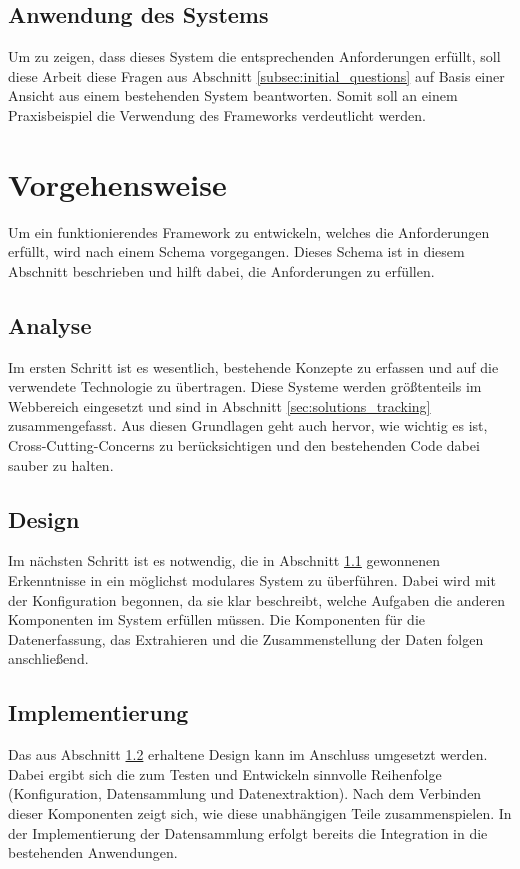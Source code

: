 \subsection{Anwendung des Systems}
Um zu zeigen, dass dieses System die entsprechenden Anforderungen erfüllt, soll diese Arbeit diese Fragen aus Abschnitt \ref{subsec:initial_questions} auf Basis einer Ansicht aus einem bestehenden System beantworten. Somit soll an einem Praxisbeispiel die Verwendung des Frameworks verdeutlicht werden.

\section{Vorgehensweise}
Um ein funktionierendes Framework zu entwickeln, welches die Anforderungen erfüllt, wird nach einem Schema vorgegangen. Dieses Schema ist in diesem Abschnitt beschrieben und hilft dabei, die Anforderungen zu erfüllen.

\subsection{Analyse}
\label{subsec:research}
Im ersten Schritt ist es wesentlich, bestehende Konzepte zu erfassen und auf die verwendete Technologie zu übertragen. Diese Systeme werden größtenteils im Webbereich eingesetzt und sind in Abschnitt \ref{sec:solutions_tracking} zusammengefasst. Aus diesen Grundlagen geht auch hervor, wie wichtig es ist, Cross-Cutting-Concerns \cite{crosscutting} zu berücksichtigen und den bestehenden Code dabei sauber zu halten.

\subsection{Design}
\label{subsec:design_info}
Im nächsten Schritt ist es notwendig, die in Abschnitt \ref{subsec:research} gewonnenen Erkenntnisse in ein möglichst modulares System zu überführen. Dabei wird mit der Konfiguration begonnen, da sie klar beschreibt, welche Aufgaben die anderen Komponenten im System erfüllen müssen. Die Komponenten für die Datenerfassung, das Extrahieren und die Zusammenstellung der Daten folgen anschließend.

\subsection{Implementierung}
Das aus Abschnitt \ref{subsec:design_info} erhaltene Design kann im Anschluss umgesetzt werden. Dabei ergibt sich die zum Testen und Entwickeln sinnvolle Reihenfolge (Konfiguration, Datensammlung und Datenextraktion). Nach dem Verbinden dieser Komponenten zeigt sich, wie diese unabhängigen Teile zusammenspielen. In der Implementierung der Datensammlung erfolgt bereits die Integration in die bestehenden Anwendungen.

